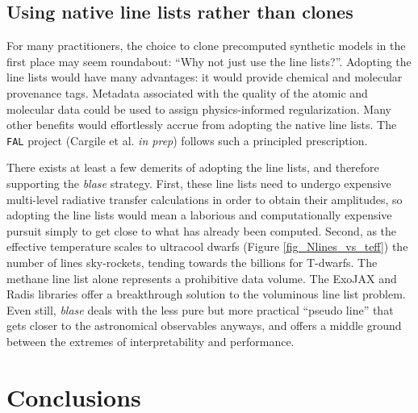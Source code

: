 \documentclass[twocolumn]{aastex631}
\begin{document}
\subsection{Using native line lists rather than clones}
For many practitioners, the choice to clone precomputed synthetic models in the first place may seem roundabout: ``Why not just use the line lists?''.  Adopting the line lists would have many advantages: it would provide chemical and molecular provenance tags.  Metadata associated with the quality of the atomic and molecular data could be used to assign physics-informed regularization.  Many other benefits would effortlessly accrue from adopting the native line lists.  The \texttt{FAL} project (Cargile et al. \emph{in prep}) follows such a principled prescription.

There exists at least a few demerits of adopting the line lists, and therefore supporting the \emph{blase} strategy.  First, these line lists need to undergo expensive multi-level radiative transfer calculations in order to obtain their amplitudes, so adopting the line lists would mean a laborious and computationally expensive pursuit simply to get close to what has already been computed.  Second, as the effective temperature scales to ultracool dwarfs (Figure \ref{fig_Nlines_vs_teff}) the number of lines sky-rockets, tending towards the billions for T-dwarfs.  The methane line list alone  represents a prohibitive data volume.  The ExoJAX and Radis  libraries offer a breakthrough solution to the voluminous line list problem.  Even still, \emph{blase} deals with the less pure but more practical ``pseudo line'' that gets closer to the astronomical observables anyways, and offers a middle ground between the extremes of interpretability and performance.


\section{Conclusions}
\lipsum[5-6]
\end{document}

